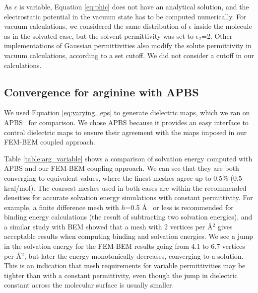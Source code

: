 As $\epsilon$ is variable, Equation \eqref{eq:phic} does not have an analytical solution, and the electrostatic potential in the vacuum state has to be computed numerically.
For vacuum calculations, we considered the same distribution of $\epsilon$ inside the molecule as in the solvated case, but the solvent permittivity was set to $\epsilon_2$=2. 
Other implementations of Gaussian permittivities also modify the solute permittivity in vacuum calculations, according to a set cutoff.\cite{li2013dielectric} We did not consider a cutoff in our calculations.



\subsection*{\sffamily \large Convergence for arginine with APBS}

We used Equation \eqref{eq:varying_eps} to generate dielectric maps, which we ran on APBS~\cite{BakerETal2001} for comparison. 
We chose APBS because it provides an easy interface to control dielectric maps to ensure their agreement with the maps imposed in our FEM-BEM coupled approach.

Table \ref{table:arg_variable} shows a comparison of solvation energy computed with APBS and our FEM-BEM coupling approach. We can see that they are both converging to equivalent values, where the finest meshes agree up to 0.5\% (0.5 kcal/mol). The coarsest meshes used in both cases are within the recommended densities for accurate solvation energy simulations with constant permittivity. For example, a finite difference mesh with $h$=0.5 \AA~ or less is recommended for binding energy calculations\cite{sorensen2015comprehensive} (the result of subtracting two solvation energies), and a similar study with BEM\cite{CooperBardhanBarba2014} showed that a mesh with 2 vertices per \AA$^2$ gives acceptable results when computing binding and solvation energies. We see a jump in the solvation energy for the FEM-BEM results going from 4.1 to 6.7 vertices per \AA$^2$, but later the energy monotonically decreases, converging to a solution. This is an indication that mesh requirements for variable permittivities may be tighter than with a constant permittivity, even though the jump in dielectric constant across the molecular surface is usually smaller. 

